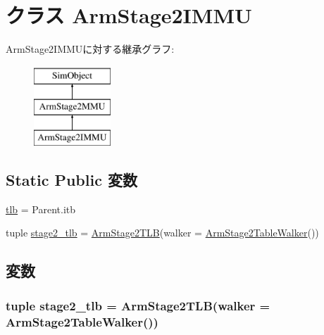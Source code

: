 \hypertarget{classArmTLB_1_1ArmStage2IMMU}{
\section{クラス ArmStage2IMMU}
\label{classArmTLB_1_1ArmStage2IMMU}
}
ArmStage2IMMUに対する継承グラフ:\begin{figure}[H]
\begin{center}
\leavevmode
\includegraphics[height=3cm]{classArmTLB_1_1ArmStage2IMMU}
\end{center}
\end{figure}
\subsection*{Static Public 変数}
\begin{DoxyCompactItemize}
\item 
\hyperlink{classArmTLB_1_1ArmStage2IMMU_aca6615da7b6b14e4b80293f21e77790c}{tlb} = Parent.itb
\item 
tuple \hyperlink{classArmTLB_1_1ArmStage2IMMU_a9909fd406bc2a10a29e8593c7fccf8b4}{stage2\_\-tlb} = \hyperlink{classArmTLB_1_1ArmStage2TLB}{ArmStage2TLB}(walker = \hyperlink{classArmTLB_1_1ArmStage2TableWalker}{ArmStage2TableWalker}())
\end{DoxyCompactItemize}


\subsection{変数}
\hypertarget{classArmTLB_1_1ArmStage2IMMU_a9909fd406bc2a10a29e8593c7fccf8b4}{
\subsubsection[{stage2\_\-tlb}]{\setlength{\rightskip}{0pt plus 5cm}tuple {\bf stage2\_\-tlb} = {\bf ArmStage2TLB}(walker = {\bf ArmStage2TableWalker}())}}
\label{classArmTLB_1_1ArmStage2IMMU_a9909fd406bc2a10a29e8593c7fccf8b4}


